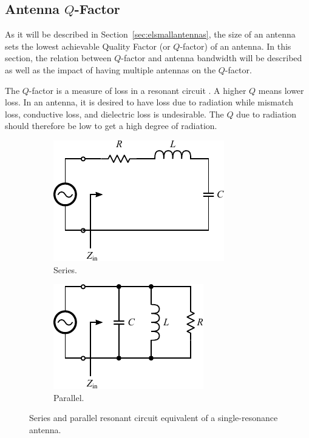 \subsection{Antenna $Q$-Factor}
As it will be described in Section~\ref{sec:elsmallantennas}, the size of an antenna sets the lowest achievable Quality Factor (or $Q$-factor) of an antenna. In this section, the relation between $Q$-factor and antenna bandwidth will be described as well as the impact of having multiple antennas on the $Q$-factor.

The $Q$-factor is a measure of loss in a resonant circuit \cite{pozar2011microwave}. A higher $Q$ means lower loss. In an antenna, it is desired to have loss due to radiation while mismatch loss, conductive loss, and dielectric loss is undesirable. The $Q$ due to radiation should therefore be low to get a high degree of radiation.

\begin{figure}[htbp]
    \centering
    \begin{subfigure}{0.49\linewidth}
        \centering
        \includegraphics{img/analysis/q_series}
        \caption{Series.}
    \end{subfigure}
    \hfill
    \begin{subfigure}{0.49\linewidth}
        \centering
        \includegraphics{img/analysis/q_shunt}
        \caption{Parallel.}
    \end{subfigure}
    \caption{Series and parallel resonant circuit equivalent of a single-resonance antenna.}
    \label{fig:qresonanteq}
\end{figure}


